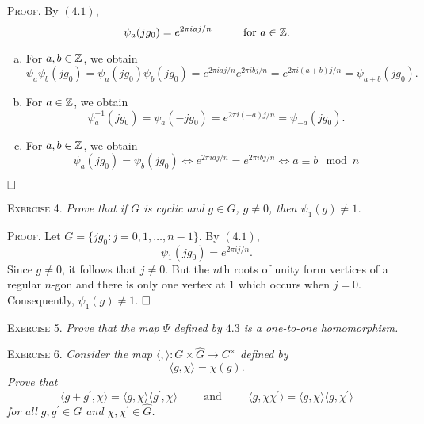 \documentclass[11pt, leqno]{article}
\newcommand{\done}{\ensuremath{\hfill\square}}
\begin{document}
\textsc{Proof}. By $(4.1)$, 
\begin{displaymath}
\psi_a(jg_0) = e^{2 \pi i aj/n} \hspace{1cm} \text{for } a\in \mathbb{Z}.
\end{displaymath} 
\begin{enumerate}[(a)]
\item For $a, b \in \mathbb{Z}$, we obtain 
\begin{displaymath}
\psi_a\psi_b(jg_0) = \psi_a(jg_0)\psi_b(jg_0) = e^{2 \pi i aj/n} e^{2 \pi i bj/n} = e^{2\pi i (a+b)j/n} = \psi_{a+b}(jg_0).
\end{displaymath} 
\item For $a\in \mathbb{Z}$, we obtain
\begin{displaymath}
\psi_a^{-1}(jg_0) = \psi_a(-jg_0) = e^{2\pi i (-a)j/n} = \psi_{-a}(jg_0).
\end{displaymath} 
\item For $a, b \in \mathbb{Z}$, we obtain 
\begin{displaymath}
\psi_a(jg_0) = \psi_b(jg_0) \iff e^{2\pi i a j/n} = e^{2\pi i bj/n} \iff a \equiv b \mod n
\end{displaymath}
\end{enumerate}
\done

\textsc{Exercise 4}. \emph{Prove that if $G$ is cyclic and $g\in G$, $g\ne 0$, then $\psi_1(g) \ne 1$.}

\textsc{Proof}. Let $G = \{ jg_0 : j = 0, 1, \ldots, n-1 \}$. By $(4.1)$, 
\begin{displaymath}
\psi_1(jg_0) = e^{2\pi i j/n}.
\end{displaymath}
Since $g \ne 0$, it follows that $j\ne 0$. But the $n$th roots of unity form vertices of a regular $n$-gon and there is only one vertex at $1$ which occurs when $j = 0$. Consequently, $\psi_1(g) \ne 1$. \done

\textsc{Exercise 5}. \emph{Prove that the map $\Psi$ defined by $4.3$ is a one-to-one homomorphism.}

\textsc{Exercise 6}. \emph{Consider the map $\langle , \rangle : G \times \widehat{G} \to C^{\times}$ defined by 
\begin{displaymath}
\langle g, \chi \rangle = \chi(g).
\end{displaymath}
Prove that 
\begin{displaymath}
\langle g+g^{\prime}, \chi \rangle = \langle g, \chi \rangle \langle g^{\prime}, \chi \rangle \hspace{1cm} \text{and} \hspace{1cm} \langle g, \chi \chi^{\prime} \rangle = \langle g, \chi \rangle \langle g, \chi^{\prime} \rangle
\end{displaymath}
for all $g, g^{\prime} \in G$ and $\chi, \chi^{\prime} \in \widehat{G}$.}
\end{document}
